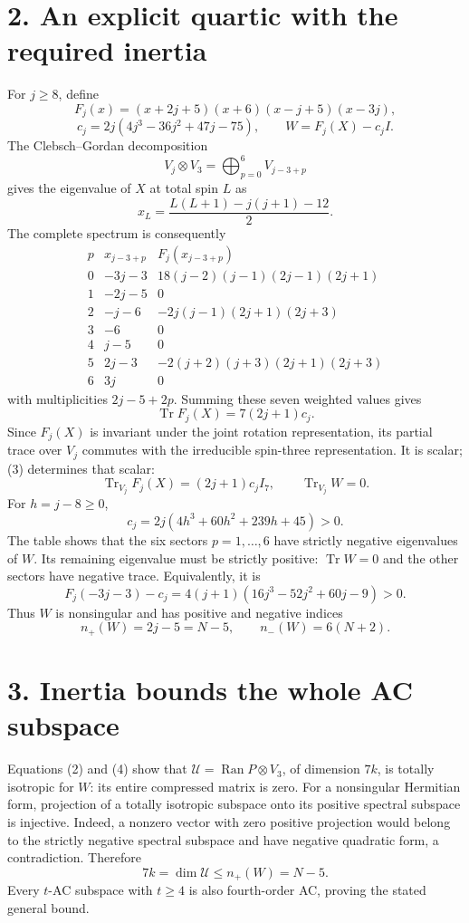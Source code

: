 \documentclass[11pt]{article}
\newcommand{\Tr}{\operatorname{Tr}}
\begin{document}
\section*{2. An explicit quartic with the required inertia}
For $j\ge8$, define
\[
 F_j(x)=(x+2j+5)(x+6)(x-j+5)(x-3j),
\]
\[
 c_j=2j(4j^3-36j^2+47j-75),\qquad W=F_j(X)-c_j I.
\]
The Clebsch--Gordan decomposition
\[
 V_j\otimes V_3=\bigoplus_{p=0}^{6}V_{j-3+p}
\]
gives the eigenvalue of $X$ at total spin $L$ as
\[
 x_L=\frac{L(L+1)-j(j+1)-12}{2}.
\]
The complete spectrum is consequently
\[
\begin{array}{c|c|c}
p&x_{j-3+p}&F_j(x_{j-3+p})\\\hline
0&-3j-3&18(j-2)(j-1)(2j-1)(2j+1)\\
1&-2j-5&0\\
2&-j-6&-2j(j-1)(2j+1)(2j+3)\\
3&-6&0\\
4&j-5&0\\
5&2j-3&-2(j+2)(j+3)(2j+1)(2j+3)\\
6&3j&0
\end{array}
\]
with multiplicities $2j-5+2p$. Summing these seven weighted values gives
\[
 \Tr F_j(X)=7(2j+1)c_j. \tag{3}
\]
Since $F_j(X)$ is invariant under the joint rotation representation,
its partial trace over $V_j$ commutes with the irreducible spin-three
representation. It is scalar; (3) determines that scalar:
\[
 \Tr_{V_j}F_j(X)=(2j+1)c_j I_7,
 \qquad \Tr_{V_j}W=0. \tag{4}
\]
For $h=j-8\ge0$,
\[
 c_j=2j(4h^3+60h^2+239h+45)>0.
\]
The table shows that the six sectors $p=1,\ldots,6$ have strictly negative
eigenvalues of $W$. Its remaining eigenvalue must be strictly positive:
$\Tr W=0$ and the other sectors have negative trace. Equivalently, it is
\[
 F_j(-3j-3)-c_j
 =4(j+1)(16j^3-52j^2+60j-9)>0.
\]
Thus $W$ is nonsingular and has positive and negative indices
\[
 n_+(W)=2j-5=N-5,\qquad n_-(W)=6(N+2). \tag{5}
\]

\section*{3. Inertia bounds the whole AC subspace}
Equations (2) and (4) show that
$\mathcal U=\operatorname{Ran}P\otimes V_3$, of dimension $7k$, is totally
isotropic for $W$: its entire compressed matrix is zero.
For a nonsingular Hermitian form, projection of a totally isotropic
subspace onto its positive spectral subspace is injective. Indeed, a
nonzero vector with zero positive projection would belong to the strictly
negative spectral subspace and have negative quadratic form, a
contradiction. Therefore
\[
 7k=\dim\mathcal U\le n_+(W)=N-5.
\]
Every $t$-AC subspace with $t\ge4$ is also fourth-order AC, proving the
stated general bound.
\end{document}
